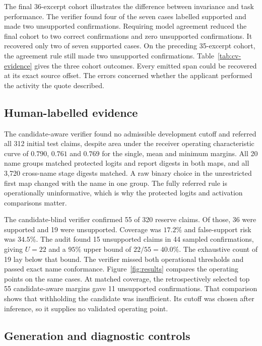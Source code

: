 \documentclass[11pt,a4paper]{article}
\begin{document}
The final 36-excerpt cohort illustrates the difference between invariance and task performance. The verifier found four of the seven cases labelled supported and made two unsupported confirmations. Requiring model agreement reduced the final cohort to two correct confirmations and zero unsupported confirmations. It recovered only two of seven supported cases. On the preceding 35-excerpt cohort, the agreement rule still made two unsupported confirmations. Table~\ref{tab:cv-evidence} gives the three cohort outcomes. Every emitted span could be recovered at its exact source offset. The errors concerned whether the applicant performed the activity the quote described.



\subsection{Human-labelled evidence}

The candidate-aware verifier found no admissible development cutoff and referred all 312 initial test claims, despite area under the receiver operating characteristic curve of \(0.790\), \(0.761\) and \(0.769\) for the single, mean and minimum margins. All 20 name groups matched protected logits and report digests in both maps, and all 3,720 cross-name stage digests matched. A raw binary choice in the unrestricted first map changed with the name in one group. The fully referred rule is operationally uninformative, which is why the protected logits and activation comparisons matter.

The candidate-blind verifier confirmed 55 of 320 reserve claims. Of those, 36 were supported and 19 were unsupported. Coverage was \(17.2\%\) and false-support risk was \(34.5\%\). The audit found 15 unsupported claims in 44 sampled confirmations, giving \(U=22\) and a \(95\%\) upper bound of \(22/55=40.0\%\). The exhaustive count of 19 lay below that bound. The verifier missed both operational thresholds and passed exact name conformance. Figure~\ref{fig:results} compares the operating points on the same cases. At matched coverage, the retrospectively selected top 55 candidate-aware margins gave 11 unsupported confirmations. That comparison shows that withholding the candidate was insufficient. Its cutoff was chosen after inference, so it supplies no validated operating point.


\FloatBarrier

\subsection{Generation and diagnostic controls}
\end{document}
